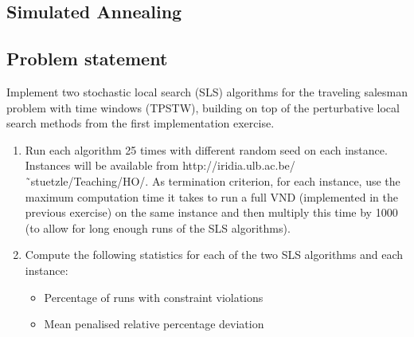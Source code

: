 
\newpage
\begin{homeworkProblem}
\section{Simulated Annealing} \label{sa}
\subsection{Problem statement}
Implement two stochastic local search (SLS) algorithms for the traveling salesman problem with time windows (TPSTW), building on top of the perturbative local search methods from the first implementation exercise.
\begin{enumerate}
  \item Run each algorithm 25 times with different random seed on each instance. Instances will be available from http://iridia.ulb.ac.be/˜stuetzle/Teaching/HO/. As termination criterion, for each instance, use the maximum computation time it takes to run a full VND (implemented in the previous exercise) on the same instance and then multiply this time by 1000 (to allow for long enough runs of the SLS algorithms).
 \item Compute the following statistics for each of the two SLS algorithms and each instance:
 \begin{itemize}
   \item Percentage of runs with constraint violations
   \item Mean penalised relative percentage deviation
 \end{itemize}


\end{enumerate}
\end{homeworkProblem}
